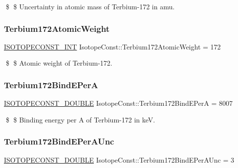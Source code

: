 \$ \$ Uncertainty in atomic mass of Terbium-\/172 in amu. \mbox{\label{group___isotope_const-_terbium-_tb172_ga22a5e5982fb2783c6125ef41df73ee7f}} 
\subsubsection{\texorpdfstring{Terbium172\+Atomic\+Weight}{Terbium172AtomicWeight}}
{\footnotesize\ttfamily \mbox{\hyperlink{group___isotope_const-_macros_ga5f18360b3e99483a35c32d789e62621c}{I\+S\+O\+T\+O\+P\+E\+C\+O\+N\+S\+T\+\_\+\+I\+NT}} Isotope\+Const\+::\+Terbium172\+Atomic\+Weight = 172}

\$ \$ Atomic weight of Terbium-\/172. \mbox{\label{group___isotope_const-_terbium-_tb172_ga0ba3247574b9d9ef8f1ba69f95337828}} 
\subsubsection{\texorpdfstring{Terbium172\+Bind\+E\+PerA}{Terbium172BindEPerA}}
{\footnotesize\ttfamily \mbox{\hyperlink{group___isotope_const-_macros_ga8f45a7272ce02c0b4c65c44636ed719a}{I\+S\+O\+T\+O\+P\+E\+C\+O\+N\+S\+T\+\_\+\+D\+O\+U\+B\+LE}} Isotope\+Const\+::\+Terbium172\+Bind\+E\+PerA = 8007}

\$ \$ Binding energy per A of Terbium-\/172 in keV. \mbox{\label{group___isotope_const-_terbium-_tb172_ga98037bbe55a08f5b07e4cb7d1e70a211}} 
\subsubsection{\texorpdfstring{Terbium172\+Bind\+E\+Per\+A\+Unc}{Terbium172BindEPerAUnc}}
{\footnotesize\ttfamily \mbox{\hyperlink{group___isotope_const-_macros_ga8f45a7272ce02c0b4c65c44636ed719a}{I\+S\+O\+T\+O\+P\+E\+C\+O\+N\+S\+T\+\_\+\+D\+O\+U\+B\+LE}} Isotope\+Const\+::\+Terbium172\+Bind\+E\+Per\+A\+Unc = 3}

